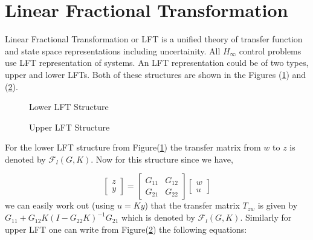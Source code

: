 \documentclass[a4paper,12pt]{article}
\begin{document}
		\section{Linear Fractional Transformation} 
		Linear Fractional Transformation or LFT is a unified theory of transfer function and state space representations including uncertainity. All $H_{\infty}$ control problems use LFT representation of systems. An LFT representation could be of two types, upper and lower LFTs. Both of these structures are shown in the Figures (\ref{llft}) and (\ref{ulft}).
			\begin{figure}[H]
 
			  \centering
			  
			  
			  \caption{Lower LFT Structure}
			 \label{llft}
		\end{figure}
			\begin{figure}[H]
 
			  \centering
			  
			  
			  \caption{Upper LFT Structure}
			 \label{ulft}
		\end{figure}
		
			For the lower LFT structure from Figure(\ref{llft}) the transfer matrix from $w$ to $z$ is denoted by $\mathscr{F}_{l}(G,K)$. Now for this structure since we have,
		
				\[
				\begin{bmatrix} 
				z\\
				y
				\end{bmatrix} = \begin{bmatrix} G_{11} & G_{12} \\ G_{21} & G_{22}\end{bmatrix} \begin{bmatrix} w \\ u\end{bmatrix}
				\]
			we can easily work out (using $u=Ky$) that the transfer matrix $T_{zw}$ is given by $G_{11}+G_{12}K(I-G_{22}K)^{-1}G_{21}$ which is denoted by $\mathscr{F}_{l}(G,K)$. Similarly for upper LFT one can write from Figure(\ref{ulft}) the following equations: 
			
\end{document}
